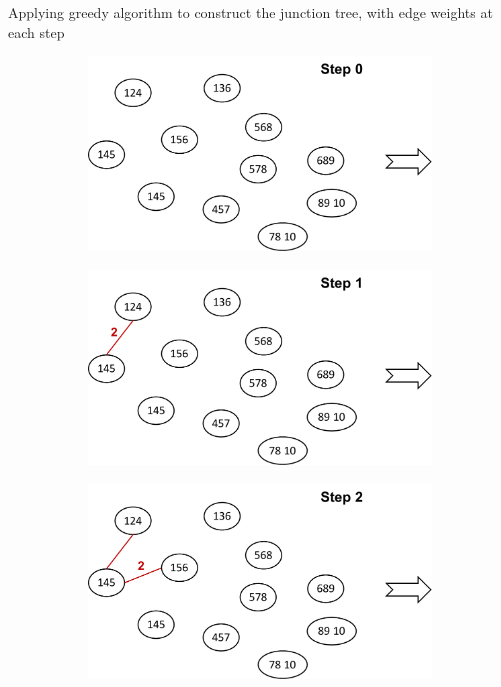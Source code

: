 \documentclass{article}
\begin{document}
Applying greedy algorithm to construct the junction tree, with edge weights at each step
\begin{figure}[h]
  \centering
  \begin{subfigure}[b]{0.315\textwidth}
  	\centering
  	\includegraphics[width=\columnwidth]{3a2.pdf}
  \end{subfigure}
  \hspace{0.1cm}
  \begin{subfigure}[b]{0.315\textwidth}
    \centering
  	\includegraphics[width=\columnwidth]{3a3.pdf}
  \end{subfigure}
  \hspace{0.1cm}
  \begin{subfigure}[b]{0.315\textwidth}
    \centering
  	\includegraphics[width=\columnwidth]{3a4.pdf}

\end{subfigure}
\end{figure}
\end{document}
